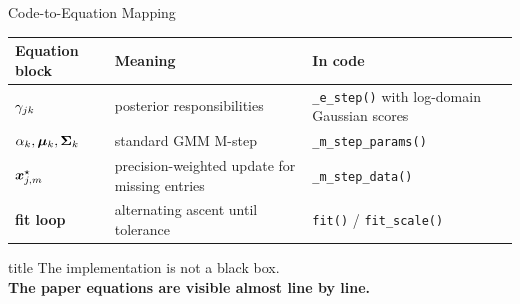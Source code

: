 \begin{frame}[shrink=4]{Code-to-Equation Mapping}
    \scriptsize
    \renewcommand{\arraystretch}{1.45}
    \begin{tabular}{>{\bfseries}p{} p{} p{}}
        Equation block & Meaning & In code \\
        \toprule
        \(\gamma_{jk}\) & posterior responsibilities & \texttt{\_e\_step()} with log-domain Gaussian scores \\
        \(\alpha_k,\bm{\mu}_k,\mathbf{\Sigma}_k\) & standard GMM M-step & \texttt{\_m\_step\_params()} \\
        \(\bm{x}_{j,m}^{\star}\) & precision-weighted update for missing entries & \texttt{\_m\_step\_data()} \\
        fit loop & alternating ascent until tolerance & \texttt{fit()} / \texttt{fit\_scale()} \\
        \bottomrule
    \end{tabular}

    \vspace{0.45cm}
    \begin{beamercolorbox}[sep=0.8em, rounded=true, shadow=true]{title}
        \large
        The implementation is not a black box.\\
        \textbf{The paper equations are visible almost line by line.}
    \end{beamercolorbox}
\end{frame}
